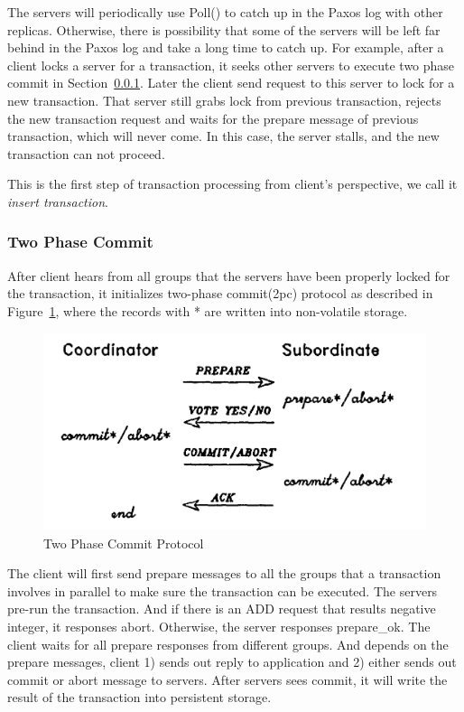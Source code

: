 \documentclass{vldb}
\begin{document}
The servers will periodically use Poll() to catch up in the Paxos log 
with other replicas. Otherwise, there is possibility that some of the 
servers will be left far behind in the Paxos log and take a long time 
to catch up. For example, after a client locks a server for a 
transaction, it seeks other servers to execute two phase commit in
Section~\ref{sec:2pc}. Later the client send request to this server to 
lock for a new transaction. That server still grabs lock from previous 
transaction, rejects the new transaction request and waits for the 
prepare message of previous transaction, which will never come. In 
this case, the server stalls, and the new transaction can not
proceed.

This is the first step of transaction processing from client's 
perspective, we call it \textit{insert transaction}.

\subsubsection{Two Phase Commit}
\label{sec:2pc}

After client hears from all groups that the servers have been properly 
locked for the transaction, it initializes two-phase commit(2pc) 
protocol as described in Figure~\ref{fig:2pc}, where the records with 
* are written into non-volatile storage.

\begin{figure}[h!]
  \centering
  \includegraphics[width = 0.8\linewidth]{figs/2PC.pdf}
  \caption{Two Phase Commit Protocol}
  \label{fig:2pc}
\end{figure}

The client will first send prepare messages to all the groups that a 
transaction involves in parallel to make sure the transaction can be 
executed. The servers pre-run the transaction. And if there is an ADD 
request that results negative integer, it responses abort. Otherwise, 
the server responses prepare\_ok. The client waits for all prepare 
responses from different groups. And depends on the prepare messages, 
client 1) sends out reply to application and 2) either sends out
commit or abort message to servers. After servers sees commit, it will 
write the result of the transaction into persistent storage.
\end{document}
